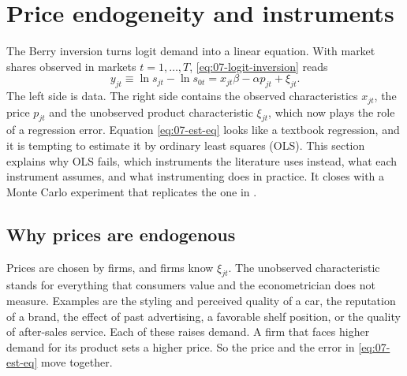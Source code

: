 \section{Price endogeneity and instruments}\label{sec:07-endogeneity}

The Berry inversion turns logit demand into a linear equation. With market shares observed in markets
$t = 1, \dots, T$, \cref{eq:07-logit-inversion} reads
\begin{equation}\label{eq:07-est-eq}
  y_{jt} \equiv \ln s_{jt} - \ln s_{0t} = x_{jt}\beta - \alpha p_{jt} + \xi_{jt}.
\end{equation}
The left side is data. The right side contains the observed characteristics $x_{jt}$, the price $p_{jt}$ and the
unobserved product characteristic $\xi_{jt}$, which now plays the role of a regression error. Equation
\eqref{eq:07-est-eq} looks like a textbook regression, and it is tempting to estimate it by ordinary least squares
(OLS). This section explains why OLS fails, which instruments the literature uses instead, what each instrument
assumes, and what instrumenting does in practice. It closes with a Monte Carlo experiment that replicates the one in
\citet{Berry1994}.

\subsection{Why prices are endogenous}\label{sec:07-endog-bias}

Prices are chosen by firms, and firms know $\xi_{jt}$. The unobserved characteristic stands for everything that
consumers value and the econometrician does not measure. Examples are the styling and perceived quality of a car, the
reputation of a brand, the effect of past advertising, a favorable shelf position, or the quality of after-sales
service. Each of these raises demand. A firm that faces higher demand for its product sets a higher price. So the
price and the error in \eqref{eq:07-est-eq} move together.


